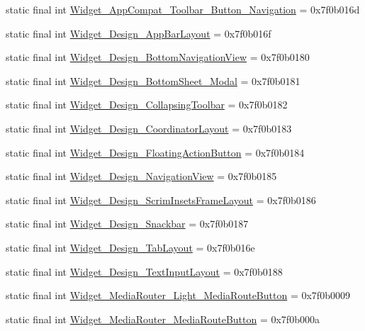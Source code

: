 \begin{CompactItemize}
\item 
static final int \hyperlink{classandroid_1_1support_1_1fragment_1_1_r_1_1style_9189119080d88aa3964b7b8eefcd1400}{Widget\_\-AppCompat\_\-Toolbar\_\-Button\_\-Navigation} = 0x7f0b016d
\item 
static final int \hyperlink{classandroid_1_1support_1_1fragment_1_1_r_1_1style_db167e3a3316c53a4f918bee59f5cd36}{Widget\_\-Design\_\-AppBarLayout} = 0x7f0b016f
\item 
static final int \hyperlink{classandroid_1_1support_1_1fragment_1_1_r_1_1style_2e75589e59b7d8044d8ff9842ec4a812}{Widget\_\-Design\_\-BottomNavigationView} = 0x7f0b0180
\item 
static final int \hyperlink{classandroid_1_1support_1_1fragment_1_1_r_1_1style_c896e2ed097d22a87869082fb23bf371}{Widget\_\-Design\_\-BottomSheet\_\-Modal} = 0x7f0b0181
\item 
static final int \hyperlink{classandroid_1_1support_1_1fragment_1_1_r_1_1style_cd3fac8a188519bdee8d9a6a8fcf03c9}{Widget\_\-Design\_\-CollapsingToolbar} = 0x7f0b0182
\item 
static final int \hyperlink{classandroid_1_1support_1_1fragment_1_1_r_1_1style_13dd72fb70aa70f19fa6ae8db099e8a0}{Widget\_\-Design\_\-CoordinatorLayout} = 0x7f0b0183
\item 
static final int \hyperlink{classandroid_1_1support_1_1fragment_1_1_r_1_1style_7f59ef8ebdf5775c40746fda81924366}{Widget\_\-Design\_\-FloatingActionButton} = 0x7f0b0184
\item 
static final int \hyperlink{classandroid_1_1support_1_1fragment_1_1_r_1_1style_0b12bc084c2e3f84d25db7a1c33a899d}{Widget\_\-Design\_\-NavigationView} = 0x7f0b0185
\item 
static final int \hyperlink{classandroid_1_1support_1_1fragment_1_1_r_1_1style_d93dc3008b5c0a85c0934c5521f7f922}{Widget\_\-Design\_\-ScrimInsetsFrameLayout} = 0x7f0b0186
\item 
static final int \hyperlink{classandroid_1_1support_1_1fragment_1_1_r_1_1style_e4e5541492f008b72c0691817e6106a8}{Widget\_\-Design\_\-Snackbar} = 0x7f0b0187
\item 
static final int \hyperlink{classandroid_1_1support_1_1fragment_1_1_r_1_1style_74a1191fc21ca04ff03dc12ecd03579c}{Widget\_\-Design\_\-TabLayout} = 0x7f0b016e
\item 
static final int \hyperlink{classandroid_1_1support_1_1fragment_1_1_r_1_1style_1debed6df7257e609602a807c7dcdfb3}{Widget\_\-Design\_\-TextInputLayout} = 0x7f0b0188
\item 
static final int \hyperlink{classandroid_1_1support_1_1fragment_1_1_r_1_1style_3dd0a54518b9f3ad97e28936e6d62c32}{Widget\_\-MediaRouter\_\-Light\_\-MediaRouteButton} = 0x7f0b0009
\item 
static final int \hyperlink{classandroid_1_1support_1_1fragment_1_1_r_1_1style_fabb48c15f59684b2c207d258158eb82}{Widget\_\-MediaRouter\_\-MediaRouteButton} = 0x7f0b000a
\end{CompactItemize}


